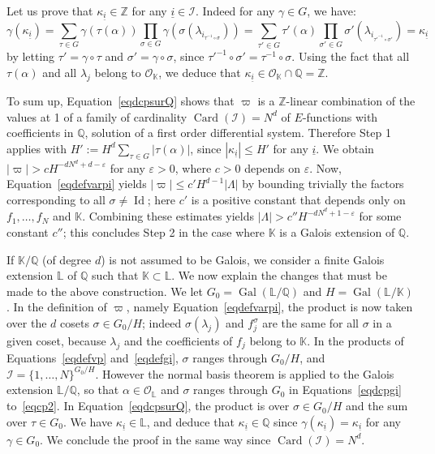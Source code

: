 \documentclass[11pt]{article}
\numberwithin{equation}{section}
\newcommand{\Efunctions}{$E$\nobreakdash-func\-tions\xspace}
\theoremstyle{definition}
\newcommand{\Z}{\mathbb{Z}}
\newcommand{\Q}{\mathbb{Q}}
\newcommand{\K}{\mathbb{K}}
\renewcommand{\L}{\mathbb{L}}
\newcommand{\Ok}{{\mathcal O}_{\K}}
\newcommand{\OL}{{\mathcal O}_{\L}}
\let\eps\varepsilon
\DeclareMathOperator{\Id}{Id}
\DeclareMathOperator{\Gal}{Gal}
\newcommand{\calI}{\mathcal I}
\DeclareMathOperator{\Card}{Card}
\newcommand{\isoul}{{\underline{i}}}
\begin{document}
Let us prove that $\kappa_{\isoul}\in \Z$ for any $ \isoul\in\calI$. Indeed for any $\gamma\in G$, we have:
\[
\gamma(\kappa_\isoul) = \sum_{\tau\in G}\gamma(\tau(\alpha)) \prod_{\sigma\in G} \gamma(\sigma(\lambda_{i_{\tau^{-1}\circ\sigma}}))
= \sum_{\tau'\in G}\tau'(\alpha)\prod_{\sigma'\in G} \sigma'(\lambda_{i_{\tau'^{-1}\circ\sigma'}}) = \kappa_{\isoul}
\]
by letting $ \tau' = \gamma\circ\tau$ and $\sigma'=\gamma\circ\sigma$, since $\tau'^{-1}\circ\sigma' = \tau^{-1}\circ\sigma$.
Using the fact that all $\tau(\alpha)$ and all $\lambda_j$ belong to $\Ok$, we deduce that $\kappa_\isoul\in \Ok\cap\Q=\Z$.

To sum up, Equation~\eqref{eqdcpsurQ} shows that $\varpi$ is a $\Z$-linear combination of the values at 1 of a family of cardinality $\Card ( \calI ) = N^d$ of \Efunctions with coefficients in $\Q$, solution of a first order differential system. Therefore Step 1 applies with $H' := H^d \sum_{\tau\in G}|\tau(\alpha)|$, since $|\kappa_\isoul|\leq H'$ for any $\isoul$. We obtain $| \varpi | > c H^{-dN^d+d-\eps}$ for any $\eps>0$, where $c>0$ depends on $\eps$.
Now, Equation~\eqref{eqdefvarpi} yields $| \varpi | \leq c' H^{d-1} |\Lambda|$ by bounding trivially the factors corresponding to all $\sigma\neq\Id$; here $c'$ is a positive constant that depends only on $f_1,\ldots,f_N$ and $\K$. Combining these estimates yields $|\Lambda|> c'' H^{- dN^d +1-\eps } $ for some constant $c''$; this concludes Step 2 in the case where $\K$ is a Galois extension of $\Q$.

If $\K/\Q$ (of degree $d$) is not assumed to be Galois, we consider a finite Galois extension $\L$ of $\Q$ such that $\K\subset \L$. We now explain the changes that must be made to the above construction. We let $G_0=\Gal(\L/\Q)$ and $H=\Gal(\L/\K)$. In the definition of $\varpi$, namely Equation~\eqref{eqdefvarpi}, the product is now taken over the $d$ cosets $\sigma\in G_0/H$; indeed $\sigma(\lambda_j)$ and $f_j^\sigma$ are the same for all $\sigma$ in a given coset, because $\lambda_j$ and the coefficients of $f_j$ belong to $\K$.
In the products of Equations~\eqref{eqdefvp} and~\eqref{eqdefgi}, $\sigma$ ranges through $G_0/H$, and $\calI = \{1,\ldots,N\}^{ G_0/H }$. However the normal basis theorem is applied to the Galois extension $\L/\Q$, so that $\alpha\in\OL$ and $\sigma$ ranges through $G_0$ in Equations~\eqref{eqdcpgi} to~\eqref{eqcp2}. In Equation~\eqref{eqdcpsurQ}, the product is over $\sigma\in G_0/H$ and the sum over $\tau\in G_0$. We have $\kappa_{\isoul}\in \L$, and deduce that $\kappa_{\isoul}\in \Q$ since $\gamma(\kappa_{\isoul}) = \kappa_{\isoul}$ for any $\gamma\in G_0$. We conclude the proof in the same way since $\Card(\calI)=N^d$.
\end{document}

